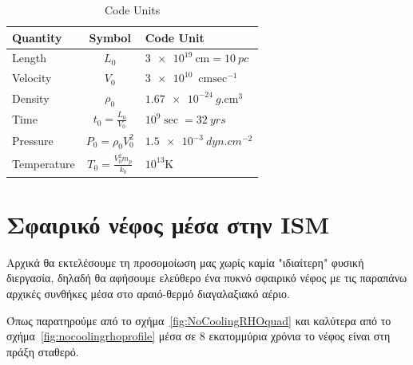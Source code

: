 			\begin{table}[H]
				\centering
				\caption{Code Units}
				\label{tab:cd}
				\begin{tabular}{|l|  c |  l|}
					\toprule
					Quantity & Symbol & Code Unit\\ 
					\midrule
					Length & $L_0$ & $\SI{3e19}{\cm} = \SI{10}{pc}$ \\
					Velocity & $V_0$ & $\SI{3e10}{\cm \sec^{-1}}$\\
					Density& $\rho_0$&$\SI{1.67e-24}{g.\cm^3}$\\
					Time & $t_0=\frac{L_0}{V_0}$ & $10^9\si{\sec} =\SI{32}{yrs}$\\
					Pressure & $P_0=\rho_0 V_0^2$ &$\SI{1.5e-3}{dyn.cm^{-2}}$ \\
					Temperature &$T_0=\frac{V_0^2m_p}{k_b}$&$10^{13}\si{\kelvin}$  \\		
					\bottomrule
				\end{tabular}
			\end{table}

	
	\section{Σφαιρικό νέφος μέσα στην ISM}

	Αρχικά θα εκτελέσουμε τη προσομοίωση μας χωρίς καμία "ιδιαίτερη" φυσική διεργασία, δηλαδή θα αφήσουμε ελεύθερο ένα πυκνό σφαιρικό νέφος με τις παραπάνω αρχικές συνθήκες μέσα στο αραιό-θερμό διαγαλαξιακό αέριο.
	
 Όπως παρατηρούμε από το σχήμα~\ref{fig:NoCoolingRHOquad} και καλύτερα από το σχήμα~\ref{fig:nocoolingrhoprofile} μέσα σε 8 εκατομμύρια χρόνια το νέφος είναι στη πράξη σταθερό. 
 
